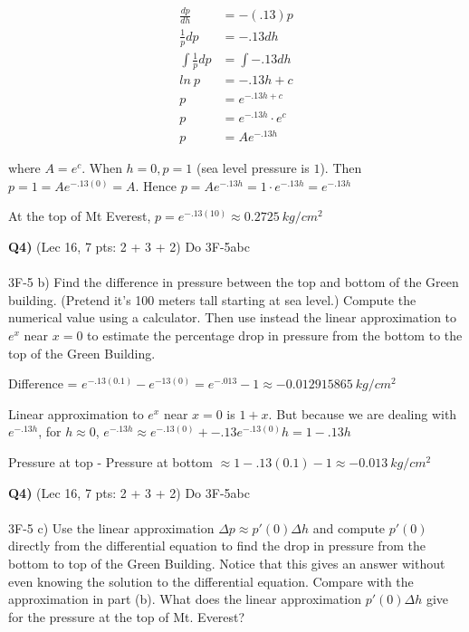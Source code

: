 \documentclass[9pt]{article}
\begin{document}
\begin{align*}
  \frac{dp}{dh} &= -(.13)p\\
  \frac{1}{p} dp &= -.13 dh\\
  \int \frac{1}{p} dp &= \int -.13 dh\\
  ln\ p &= -.13h + c\\
  p &= e^{-.13h + c}\\
  p &= e^{-.13h} \cdot e^c\\
  p &= A e^{-.13h}
\end{align*}

where $A = e^c$. When $h = 0, p = 1$ (sea level pressure is $1$). Then $p = 1 = A e^{-.13(0)} = A$. Hence $p = A e^{-.13h} = 1 \cdot e^{-.13h} = e^{-.13h}$

At the top of Mt Everest, $p = e^{-.13(10)} \approx 0.2725\ kg/cm^2$

\begin{tcolorbox}
  \textbf{Q4)} (Lec 16, 7 pts: 2 + 3 + 2) Do 3F-5abc\\
  \\
  3F-5 b) Find the difference in pressure between the top and bottom of the Green building. (Pretend it's 100 meters tall starting at sea level.) Compute the numerical value using a calculator. Then use instead the linear approximation to $e^x$ near $x = 0$ to estimate the percentage drop in pressure from the bottom to the top of the Green Building.
\end{tcolorbox}

Difference = $e^{-.13(0.1)} - e^{-13(0)} = e^{-.013} - 1 \approx -0.012915865\ kg/cm^2$

Linear approximation to $e^x$ near $x = 0$ is $1 + x$. But because we are dealing with $e^{-.13h}$, for $h \approx 0$, $e^{-.13h} \approx e^{-.13(0)} + -.13e^{-.13(0)}h = 1 - .13h$

Pressure at top - Pressure at bottom $\approx 1 - .13(0.1) - 1 \approx -0.013\ kg/cm^2$
\begin{tcolorbox}
  \textbf{Q4)} (Lec 16, 7 pts: 2 + 3 + 2) Do 3F-5abc\\
  \\
  3F-5 c) Use the linear approximation $\Delta p \approx p'(0) \Delta h$ and compute $p'(0)$ directly from the differential equation to find the drop in pressure from the bottom to top of the Green Building. Notice that this gives an answer without even knowing the solution to the differential equation. Compare with the approximation in part (b). What does the linear approximation $p'(0)\Delta h$ give for the pressure at the top of Mt. Everest?
\end{tcolorbox}
\end{document}
